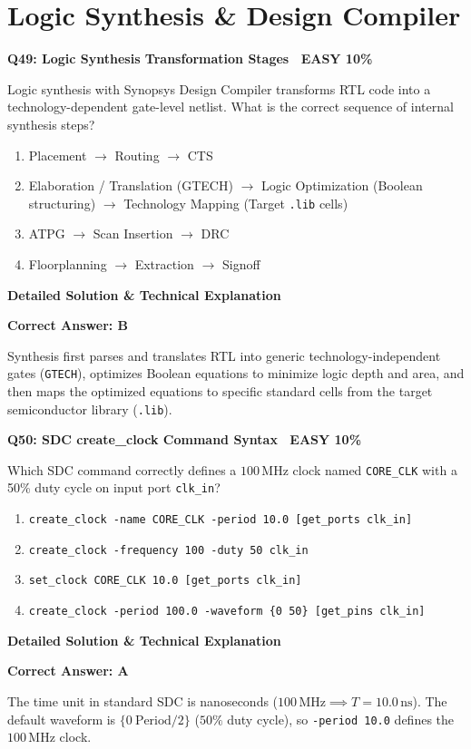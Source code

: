 \documentclass[11pt,a4paper]{article}
\newcommand{\badgeeasy}{{\color{white}\colorbox{easygreen}{\bfseries\sffamily\tiny\ EASY 10\%\ }}}
\newenvironment{qbox}[2]{%
  \begin{mdframed}[style=qstyle]%
  {\bfseries\sffamily\color{primaryblue}#1 \hfill #2}\par\vspace{2pt}%
}{%
  \end{mdframed}%
}
\newenvironment{ansbox}{%
  \begin{mdframed}[style=ansstyle]%
  {\bfseries\sffamily\color{ansgreen}\small Detailed Solution \& Technical Explanation}\par\vspace{2pt}\small%
}{%
  \end{mdframed}%
}
\begin{document}
\section{Logic Synthesis \& Design Compiler}

\begin{qbox}{Q49: Logic Synthesis Transformation Stages}{\badgeeasy}
Logic synthesis with Synopsys Design Compiler transforms RTL code into a technology-dependent gate-level netlist. What is the correct sequence of internal synthesis steps?
\begin{enumerate}[label=\textbf{\Alph*.}]
  \item Placement $\rightarrow$ Routing $\rightarrow$ CTS
  \item Elaboration / Translation (GTECH) $\rightarrow$ Logic Optimization (Boolean structuring) $\rightarrow$ Technology Mapping (Target \texttt{.lib} cells)
  \item ATPG $\rightarrow$ Scan Insertion $\rightarrow$ DRC
  \item Floorplanning $\rightarrow$ Extraction $\rightarrow$ Signoff
\end{enumerate}
\end{qbox}
\begin{ansbox}
\textbf{Correct Answer: B}

Synthesis first parses and translates RTL into generic technology-independent gates (\texttt{GTECH}), optimizes Boolean equations to minimize logic depth and area, and then maps the optimized equations to specific standard cells from the target semiconductor library (\texttt{.lib}).
\end{ansbox}

\begin{qbox}{Q50: SDC create\_clock Command Syntax}{\badgeeasy}
Which SDC command correctly defines a $100\,\text{MHz}$ clock named \texttt{CORE\_CLK} with a 50\% duty cycle on input port \texttt{clk\_in}?
\begin{enumerate}[label=\textbf{\Alph*.}]
  \item \texttt{create\_clock -name CORE\_CLK -period 10.0 [get\_ports clk\_in]}
  \item \texttt{create\_clock -frequency 100 -duty 50 clk\_in}
  \item \texttt{set\_clock CORE\_CLK 10.0 [get\_ports clk\_in]}
  \item \texttt{create\_clock -period 100.0 -waveform \{0 50\} [get\_pins clk\_in]}
\end{enumerate}
\end{qbox}
\begin{ansbox}
\textbf{Correct Answer: A}

The time unit in standard SDC is nanoseconds ($100\,\text{MHz} \implies T = 10.0\,\text{ns}$). The default waveform is $\{0\ \text{Period}/2\}$ ($50\%$ duty cycle), so \texttt{-period 10.0} defines the $100\,\text{MHz}$ clock.
\end{ansbox}
\end{document}
